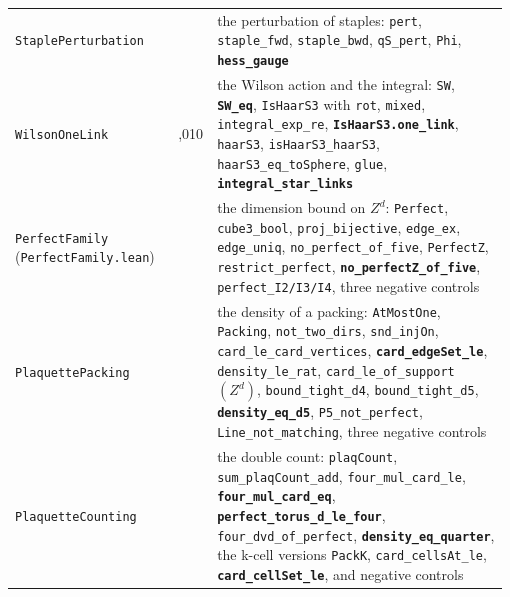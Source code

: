 \documentclass[11pt,a4paper]{article}
\theoremstyle{named}
\begin{document}
\begin{small}
\begin{longtable}{>{\raggedright\arraybackslash}p{0.331\linewidth}>{\raggedright\arraybackslash}p{0.05\linewidth}>{\raggedright\arraybackslash}p{0.596\linewidth}}
\texttt{StaplePerturbation} & 386 & the perturbation of staples: \texttt{pert}, \texttt{staple\_\allowbreak{}fwd}, \texttt{staple\_\allowbreak{}bwd}, \texttt{qS\_\allowbreak{}pert}, \texttt{Phi}, \textbf{\texttt{hess\_\allowbreak{}gauge}} \\
\texttt{WilsonOneLink} & 1,010 & the Wilson action and the integral: \texttt{SW}, \textbf{\texttt{SW\_\allowbreak{}eq}}, \texttt{IsHaarS3} with \texttt{rot}, \texttt{mixed}, \texttt{integral\_\allowbreak{}exp\_\allowbreak{}re}, \textbf{\texttt{IsHaarS3.\allowbreak{}one\_\allowbreak{}link}}, \texttt{haarS3}, \texttt{isHaarS3\_\allowbreak{}haarS3}, \texttt{haarS3\_\allowbreak{}eq\_\allowbreak{}toSphere}, \texttt{glue}, \textbf{\texttt{integral\_\allowbreak{}star\_\allowbreak{}links}} \\
\texttt{PerfectFamily} (\texttt{PerfectFamily.\allowbreak{}lean}) & 462 & the dimension bound on $Z^d$: \texttt{Perfect}, \texttt{cube3\_\allowbreak{}bool}, \texttt{proj\_\allowbreak{}bijective}, \texttt{edge\_\allowbreak{}ex}, \texttt{edge\_\allowbreak{}uniq}, \texttt{no\_\allowbreak{}perfect\_\allowbreak{}of\_\allowbreak{}five}, \texttt{PerfectZ}, \texttt{restrict\_\allowbreak{}perfect}, \textbf{\texttt{no\_\allowbreak{}perfectZ\_\allowbreak{}of\_\allowbreak{}five}}, \texttt{perfect\_\allowbreak{}I2/I3/I4}, three negative controls \\
\texttt{PlaquettePacking} & 300 & the density of a packing: \texttt{AtMostOne}, \texttt{Packing}, \texttt{not\_\allowbreak{}two\_\allowbreak{}dirs}, \texttt{snd\_\allowbreak{}injOn}, \texttt{card\_\allowbreak{}le\_\allowbreak{}card\_\allowbreak{}vertices}, \textbf{\texttt{card\_\allowbreak{}edgeSet\_\allowbreak{}le}}, \texttt{density\_\allowbreak{}le\_\allowbreak{}rat}, \texttt{card\_\allowbreak{}le\_\allowbreak{}of\_\allowbreak{}support} $(Z^d)$, \texttt{bound\_\allowbreak{}tight\_\allowbreak{}d4}, \texttt{bound\_\allowbreak{}tight\_\allowbreak{}d5}, \textbf{\texttt{density\_\allowbreak{}eq\_\allowbreak{}d5}}, \texttt{P5\_\allowbreak{}not\_\allowbreak{}perfect}, \texttt{Line\_\allowbreak{}not\_\allowbreak{}matching}, three negative controls \\
\texttt{PlaquetteCounting} & 529 & the double count: \texttt{plaqCount}, \texttt{sum\_\allowbreak{}plaqCount\_\allowbreak{}add}, \texttt{four\_\allowbreak{}mul\_\allowbreak{}card\_\allowbreak{}le}, \textbf{\texttt{four\_\allowbreak{}mul\_\allowbreak{}card\_\allowbreak{}eq}}, \textbf{\texttt{perfect\_\allowbreak{}torus\_\allowbreak{}d\_\allowbreak{}le\_\allowbreak{}four}}, \texttt{four\_\allowbreak{}dvd\_\allowbreak{}of\_\allowbreak{}perfect}, \textbf{\texttt{density\_\allowbreak{}eq\_\allowbreak{}quarter}}, the k-cell versions \texttt{PackK}, \texttt{card\_\allowbreak{}cellsAt\_\allowbreak{}le}, \textbf{\texttt{card\_\allowbreak{}cellSet\_\allowbreak{}le}}, and negative controls \\

\end{longtable}
\end{small}
\end{document}
